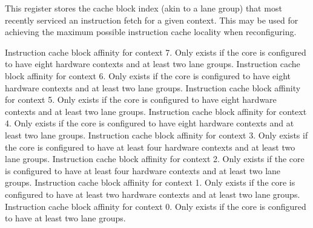 This register stores the cache block index (akin to a lane group) that most
recently serviced an instruction fetch for a given context. This may be used for
achieving the maximum possible instruction cache locality when reconfiguring.

Instruction cache block affinity for context 7. Only exists if the core is
configured to have eight hardware contexts and at least two lane groups.
Instruction cache block affinity for context 6. Only exists if the core is
configured to have eight hardware contexts and at least two lane groups.
Instruction cache block affinity for context 5. Only exists if the core is
configured to have eight hardware contexts and at least two lane groups.
Instruction cache block affinity for context 4. Only exists if the core is
configured to have eight hardware contexts and at least two lane groups.
Instruction cache block affinity for context 3. Only exists if the core is
configured to have at least four hardware contexts and at least two lane groups.
Instruction cache block affinity for context 2. Only exists if the core is
configured to have at least four hardware contexts and at least two lane groups.
Instruction cache block affinity for context 1. Only exists if the core is
configured to have at least two hardware contexts and at least two lane groups.
Instruction cache block affinity for context 0. Only exists if the core is
configured to have at least two lane groups.

